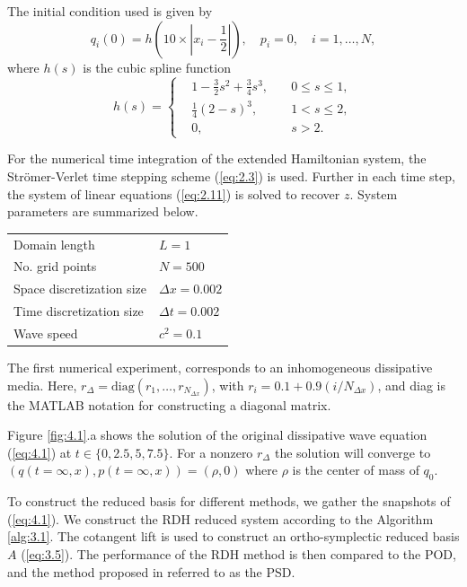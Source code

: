 The initial condition used is given by
\begin{equation} \label{eq:4.5}
	q_i(0) = h( 10\times|x_i - \frac{1}{2}| ), \quad p_i = 0, \quad i=1,\dots,N,
\end{equation}
where $h(s)$ is the cubic spline function
\begin{equation} \label{eq:4.6}
h(s) = 
\left\{
\begin{aligned}
& 1 - \frac{3}{2}s^2 + \frac{3}{4}s^3, \quad & 0\leq s \leq 1, \\
& \frac{1}{4}(2-s)^3, & 1< s \leq 2, \\
& 0, & s > 2.
\end{aligned}
\right.
\end{equation}

For the numerical time integration of the extended Hamiltonian system, the Str\"omer-Verlet time stepping scheme (\ref{eq:2.3}) is used. Further in each time step, the system of linear equations (\ref{eq:2.11}) is solved to recover $z$. System parameters are summarized below.
\vspace{0.5cm}
\begin{center}
\begin{tabular}{|l|l|}
\hline
Domain length & $L = 1$ \\
No. grid points & $N = 500$ \\
Space discretization size & $\Delta x = 0.002$ \\
Time discretization size & $\Delta t = 0.002$ \\
Wave speed & $c^2 = 0.1$ \\
\hline
\end{tabular}
\end{center}
\vspace{0.5cm}

The first numerical experiment, corresponds to an inhomogeneous dissipative media. Here, $r_{\Delta} = \text{diag}(r_1,\dots,r_{N_{\Delta x}})$, with $r_i = 0.1 + 0.9(i/N_{\Delta x})$, and diag is the MATLAB notation for constructing a diagonal matrix.

Figure \ref{fig:4.1}.a shows the solution of the original dissipative wave equation (\ref{eq:4.1}) at $t \in \{0,2.5,5,7.5\}$. For a nonzero $r_\Delta$ the solution will converge to $(q(t=\infty,x),p(t=\infty,x)) = (\rho,0)$ where $\rho$ is the center of mass of $q_0$. 

To construct the reduced basis for different methods, we gather the snapshots of (\ref{eq:4.1}). We construct the RDH reduced system according to the Algorithm \ref{alg:3.1}. The cotangent lift is used to construct an ortho-symplectic reduced basis $A$ (\ref{eq:3.5}). The performance of the RDH method is then compared to the POD, and the method proposed in \cite{peng2016geometric} referred to as the PSD.

